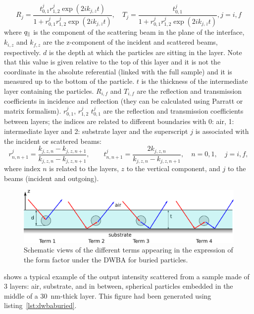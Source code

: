 \begin{equation*}
R_j =\frac{t^{j}_{0,1}r^{j}_{1,2}\exp(2ik_{j,z}t)}{1+r^{j}_{0,1}r^{j}_{1,2}\exp(2ik_{j,z}t)}, \quad T_j=\frac{t^{j}_{0,1}}{1+r^{j}_{0,1}r^{j}_{1,2}\exp(2ik_{j,z}t)}, j=i,f
\end{equation*}
where $q_{\parallel}$ is the component of the scattering beam in the plane of the interface, $k_{i,z}$ and $k_{f,z}$ are the z-component of the incident and scattered beams, respectively.  $d$ is the depth at which the particles are sitting in the layer. Note that this value is given relative to the top of this layer and it is not the coordinate in the absolute referential (linked with the full sample) and it is measured up to the bottom of the particle. $t$ is the thickness of the intermediate layer containing the particles. $R_{i,f}$ and $T_{i,f}$  are the reflection  and transmission coefficients in incidence and reflection (they can be calculated using Parratt or matrix formalism). $r^j_{0,1}$, $r^j_{1,2}$ $t^j_{0,1}$ are the reflection and transmission coefficients between layers; the indices are related to different boundaries with 0: air, 1: intermediate layer and 2: substrate layer and the superscript $j$ is associated with the incident or scattered beams:
\begin{equation*}
r^j_{n,n+1}=\frac{k_{j,z,n}-k_{j,z,n+1}}{k_{j,z,n}-k_{j,z,n+1}}, \qquad t^j_{n,n+1}= \frac{2k_{j,z,n}}{k_{j,z,n}-k_{j,z,n+1}}, \quad n=0,1, \quad j=i,f,
\end{equation*}
where index $n$ is related to the layers, $z$ to the vertical component, and $j$ to the beams (incident and outgoing).

\begin{figure}[tb]
\begin{center}
\includegraphics[width=\textwidth]{fig/drawing/drawingDWBAburied.pdf}
\end{center}
\caption{Schematic views of the different terms appearing in the expression of the form factor under the DWBA for buried particles.}
\label{fig:SchemDWBAburied}
\end{figure}


 shows a typical example of the output intensity scattered from a sample made of 3 layers: air, substrate, and in between, spherical particles embedded in the middle of a 30~nm-thick layer. This figure had been generated using listing~\ref{lst:dwbaburied}.

